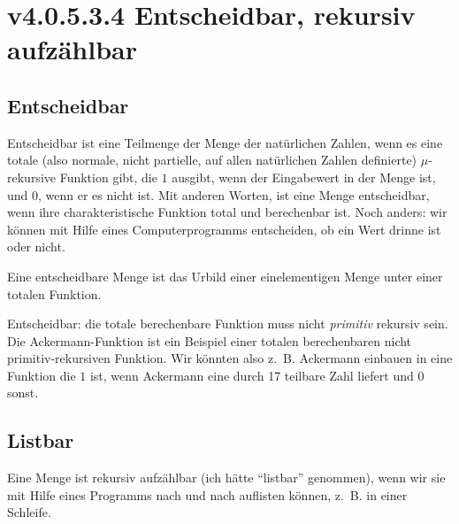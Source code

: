 \documentclass[a4paper]{amsart}
\theoremstyle{definition}
\newcommand{\zb}{z.~B. }
\begin{document}
\section{v4.0.5.3.4 Entscheidbar, rekursiv aufzählbar}

\subsection{Entscheidbar}
Entscheidbar ist eine Teilmenge der Menge der natürlichen Zahlen, wenn es eine totale (also normale, nicht partielle, auf allen natürlichen Zahlen definierte) $\mu$-rekursive Funktion gibt, die $1$ ausgibt, wenn der Eingabewert in der Menge ist, und $0$, wenn er es nicht ist. Mit anderen Worten, ist eine Menge entscheidbar, wenn ihre charakteristische Funktion total und berechenbar ist. Noch anders: wir können mit Hilfe eines Computerprogramms entscheiden, ob ein Wert drinne ist oder nicht.

Eine entscheidbare Menge ist das Urbild einer einelementigen Menge unter einer totalen Funktion.

Entscheidbar: die totale berechenbare Funktion muss nicht \emph{primitiv} rekursiv sein. Die Ackermann-Funktion ist ein Beispiel einer totalen berechenbaren nicht primitiv-rekursiven Funktion. Wir könnten also \zb Ackermann einbauen in eine Funktion die $1$ ist, wenn Ackermann eine durch 17 teilbare Zahl liefert und $0$ sonst.

\subsection{Listbar}
Eine Menge ist rekursiv aufzählbar (ich hätte "`listbar"' genommen), wenn wir sie mit Hilfe eines Programms nach und nach auflisten können, \zb in einer Schleife.
\end{document}
